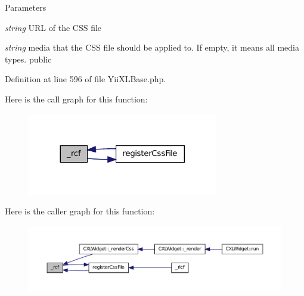 \begin{DoxyParams}{Parameters}
\item[{\em string}]URL of the CSS file \item[{\em string}]media that the CSS file should be applied to. If empty, it means all media types.  public \end{DoxyParams}


Definition at line 596 of file YiiXLBase.php.








Here is the call graph for this function:\nopagebreak
\begin{figure}[H]
\begin{center}
\leavevmode
\includegraphics[width=236pt]{classYiiXLBase_a617fe0ffa46c9fc20d8c3576a2c73cf8_cgraph}
\end{center}
\end{figure}




Here is the caller graph for this function:\nopagebreak
\begin{figure}[H]
\begin{center}
\leavevmode
\includegraphics[width=400pt]{classYiiXLBase_a617fe0ffa46c9fc20d8c3576a2c73cf8_icgraph}
\end{center}
\end{figure}


